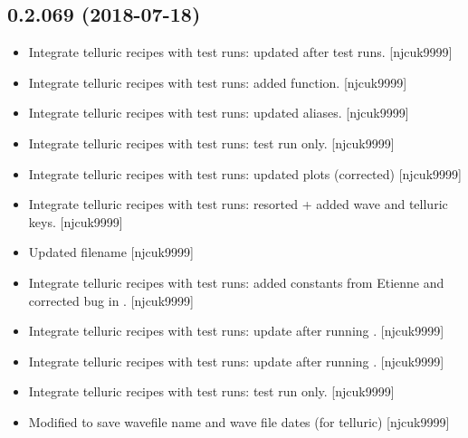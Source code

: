 \documentclass[a4paper,10pt,english]{report}
\begin{document}
\subsection{0.2.069 (2018-07-18)}
\label{\detokenize{misc/changelog:id389}}\begin{itemize}
\item {} 
Integrate telluric recipes with test runs: updated after test runs.
{[}njcuk9999{]}

\item {} 
Integrate telluric recipes with test runs: added 
function. {[}njcuk9999{]}

\item {} 
Integrate telluric recipes with test runs: updated aliases.
{[}njcuk9999{]}

\item {} 
Integrate telluric recipes with test runs: test run only. {[}njcuk9999{]}

\item {} 
Integrate telluric recipes with test runs: updated plots (corrected)
{[}njcuk9999{]}

\item {} 
Integrate telluric recipes with test runs: resorted  + added
wave and telluric keys. {[}njcuk9999{]}

\item {} 
Updated filename  {[}njcuk9999{]}

\item {} 
Integrate telluric recipes with test runs: added constants from
Etienne and corrected bug in . {[}njcuk9999{]}

\item {} 
Integrate telluric recipes with test runs: update after running
. {[}njcuk9999{]}

\item {} 
Integrate telluric recipes with test runs: update after running
. {[}njcuk9999{]}

\item {} 
Integrate telluric recipes with test runs: test run only. {[}njcuk9999{]}

\item {} 
Modified  to save wavefile name and wave file dates (for
telluric) {[}njcuk9999{]}

\end{itemize}
\end{document}
